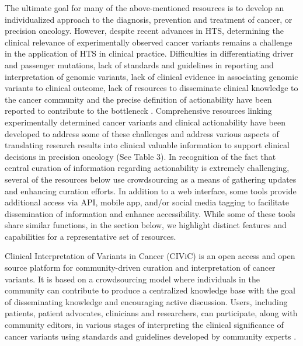 \documentclass[10pt,letterpaper]{article}
\begin{document}
The ultimate goal for many of the above-mentioned resources is to
develop an individualized approach to the diagnosis, prevention and
treatment of cancer, or precision oncology. However, despite recent
advances in HTS, determining the clinical relevance of experimentally
observed cancer variants remains a challenge in the application of HTS
in clinical practice. Difficulties in differentiating driver and
passenger mutations, lack of standards and guidelines in reporting and
interpretation of genomic variants, lack of clinical evidence in
associating genomic variants to clinical outcome, lack of resources to
disseminate clinical knowledge to the cancer community and the precise
definition of actionability have been reported to contribute to the
bottleneck
\cite{Li2017-aw,Prawira2017-gv,Uzilov2016-ct,Hedley_Carr2016-ul}. Comprehensive
resources linking experimentally determined cancer variants and
clinical actionability have been developed to address some of these
challenges and address various aspects of translating research results
into clinical valuable information to support clinical decisions in
precision oncology (See Table 3). In recognition of the fact that
central curation of information regarding actionability is extremely
challenging, several of the resources below use crowdsourcing as a
means of gathering updates and enhancing curation efforts. In addition
to a web interface, some tools provide additional access via API,
mobile app, and/or social media tagging to facilitate dissemination of
information and enhance accessibility. While some of these tools share
similar functions, in the section below, we highlight distinct
features and capabilities for a representative set of resources.

Clinical Interpretation of Variants in Cancer (CIViC) is an open
access and open source platform for community-driven curation and
interpretation of cancer variants. It is based on a crowdsourcing
model where individuals in the community can contribute to produce a
centralized knowledge base with the goal of disseminating knowledge
and encouraging active discussion. Users, including patients, patient
advocates, clinicians and researchers, can participate, along with
community editors, in various stages of interpreting the clinical
significance of cancer variants using standards and guidelines
developed by community experts \cite{Li2017-aw,Griffith2016-sy}.
\end{document}
